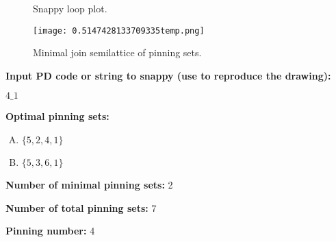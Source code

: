 \documentclass{article}%
\begin{document}
\begin{multicols}{2}
\begin{figure}[H]
\centering

\caption{Snappy loop plot.}
\label{fig:0.433372964838602temp.svg}
\end{figure}\columnbreak

\begin{figure}[H]
\centering
\texttt{[image: 0.5147428133709335temp.png]}
\caption{Minimal join semilattice of pinning sets.}
\label{fig:0.5147428133709335temp.png}
\end{figure}\end{multicols}\newpage\begin{multicols}{2}

\columnbreak

\noindent\textbf{Input PD code or string to snappy (use to reproduce the drawing):}

	$4\_1$

\noindent\textbf{Optimal pinning sets:}

\begin{enumerate}[A)]
\item{\Huge\textcolor{green0}{\textbullet}}$\{5,2,4,1\}$

\item{\Huge\textcolor{green1}{\textbullet}}$\{5,3,6,1\}$

\end{enumerate}


\noindent\textbf{Number of minimal pinning sets:} 2

\noindent\textbf{Number of total pinning sets:} 7

\noindent\textbf{Pinning number:} 4


\end{multicols}
\end{document}
